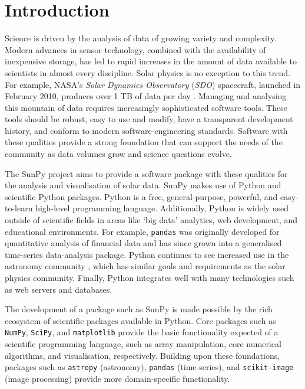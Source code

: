 \section{Introduction}\label{sec:Intro}

Science is driven by the analysis of data of growing variety and complexity.
Modern advances in sensor technology, combined with the availability of inexpensive 
storage, has led to rapid increases in the amount of data available to scientists in almost
every discipline.  Solar physics is no exception to this trend. For example,
NASA's \textit{Solar Dynamics Observatory} (\textit{SDO}) spacecraft, launched
in February 2010, produces over 1 TB of data per day \citep{aia}. Managing and
analysing this mountain of data requires increasingly sophisticated software
tools. These tools should be robust, easy to use and modify, have a transparent
development history, and conform to modern software-engineering
standards. Software with these qualities provide a strong foundation that can support the
needs of the community as data volumes grow and science questions evolve.

The SunPy project aims to provide a software package with these qualities for 
the analysis and visualisation of solar data. SunPy makes
use of Python and scientific Python packages. Python is a free, general-purpose, 
powerful, and easy-to-learn high-level programming language. Additionally, Python is 
widely used outside of scientific fields in areas like `big data' analytics, web 
development, and educational environments. For example, \texttt{pandas} was 
originally developed for quantitative analysis of financial data and has since 
grown into a generalised time-series data-analysis package. Python continues to 
see increased use in the astronomy community \citep{greenfield2011}, which has 
similar goals and requirements as the solar physics community. Finally, Python 
integrates well with many technologies such as web servers \citep{dolgert2008} and databases. 

The development of a package such as SunPy is made possible by the rich ecosystem of 
scientific packages available in Python. Core packages such as \texttt{NumPy}, 
\texttt{SciPy}, and \texttt{matplotlib} provide the basic functionality expected of a 
scientific programming language,
such as array manipulation, core numerical algorithms, and visualisation, respectively.
Building upon these foundations, packages such as \texttt{astropy} (astronomy), \texttt{pandas} (time-series), and
\texttt{scikit-image} (image processing) provide more domain-specific functionality.

